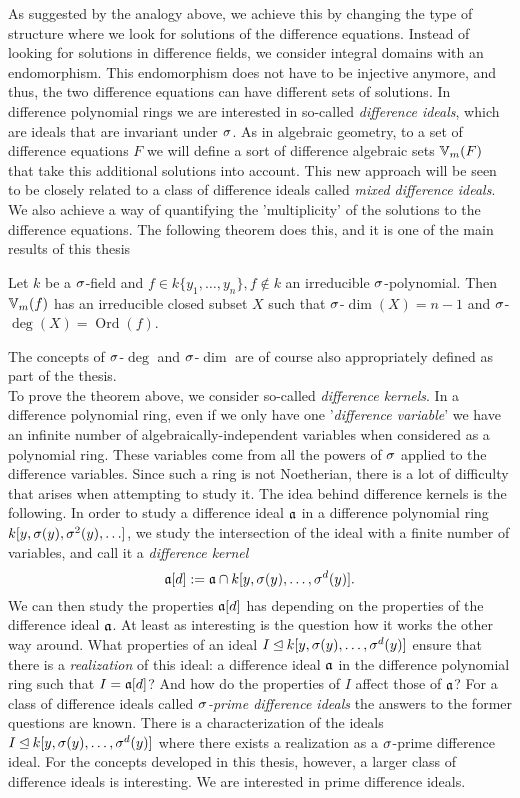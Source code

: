 As suggested by the analogy above, we achieve this by changing the type of structure where we look for solutions of the difference equations. Instead of looking for solutions in difference fields,
we consider integral domains with an endomorphism. This endomorphism does not have to be injective anymore, and thus, the two difference equations can have different sets of solutions.
In difference polynomial rings we are interested in so-called \emph{difference ideals}, which are ideals that are invariant under $\sigma$. 
As in algebraic geometry, to a set of difference equations $F$ we will define a sort of difference algebraic sets $\mathbb{V}_m(F)$ that take this additional solutions into account.
This new approach will be seen to be closely related to a class of difference ideals called \emph{mixed difference ideals}.
We also achieve a way of quantifying the 'multiplicity' of the solutions to the difference equations. The following theorem does this, and it is one of the main results of this thesis

\begin{theorem*}
Let $k$ be a $\sigma$-field and $f \in k\{y_1,\ldots,y_n\}, f \notin k$ an irreducible $\sigma$-polynomial. 
Then $\mathbb{V}_m(f)$ has an irreducible closed subset $X$ such that $\sigma$-$\dim(X) = n-1$ and $\sigma$-$\operatorname{deg}(X) = \operatorname{Ord}(f)$.
\end{theorem*}

The concepts of $\sigma$-$\operatorname{deg}$ and $\sigma$-$\dim$ are of course also appropriately defined as part of the thesis. \\

To prove the theorem above, we consider so-called \emph{difference kernels}.
In a difference polynomial ring, even if we only have one '\emph{difference variable}' we have an infinite number of algebraically-independent variables when considered as a polynomial ring. 
These variables come from all the powers of $\sigma$ applied to the difference variables. Since such a ring is not Noetherian, there is a lot of difficulty that arises when attempting to study it. 
The idea behind difference kernels is the following.
In order to study a difference ideal $\mathfrak{a}$ in a difference polynomial ring $k[y,\sigma(y),\sigma^2(y),\ldots]$,
we study the intersection of the ideal with a finite number of variables, and call it a \emph{difference kernel} $$\mathfrak{a}[d] := \mathfrak{a} \cap k[y,\sigma(y),\ldots,\sigma^d(y)].$$
We can then study the properties $\mathfrak{a}[d]$ has depending on the properties of the difference ideal $\mathfrak{a}$. At least as interesting is the question how it works the other way around.
What properties of an ideal $I \unlhd k[y,\sigma(y),\ldots,\sigma^d(y)]$ ensure that there is a \emph{realization} of this ideal: a difference ideal $\mathfrak{a}$ in the difference polynomial ring such that $I = \mathfrak{a}[d]$?
 And how do the properties of $I$ affect those of $\mathfrak{a}$?
For a class of difference ideals called \emph{$\sigma$-prime difference ideals} the answers to the former questions are known. 
There is a characterization of the ideals $I \unlhd k[y,\sigma(y),\ldots,\sigma^d(y)]$ where there exists a realization as a $\sigma$-prime difference ideal. 
For the concepts developed in this thesis, however, a larger class of difference ideals is interesting. We are interested in prime difference ideals. 

